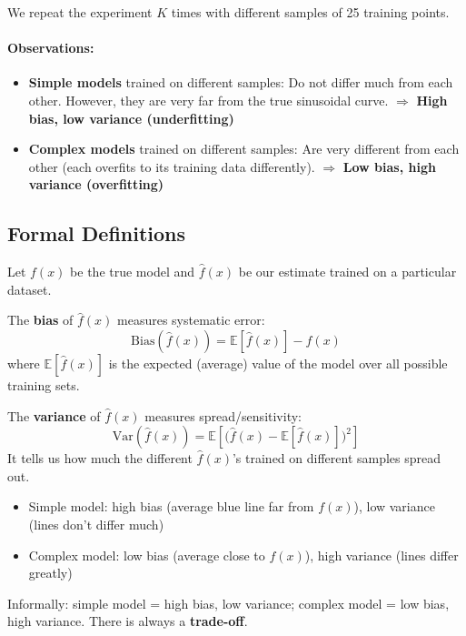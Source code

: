\documentclass[12pt,a4paper]{article}
\newcommand{\E}{\mathbb{E}}
\newcommand{\Var}{\mathrm{Var}}
\newcommand{\Bias}{\mathrm{Bias}}
\begin{document}
We repeat the experiment $K$ times with different samples of 25 training points.

\paragraph{Observations:}
\begin{itemize}
  \item \textbf{Simple models} trained on different samples: Do not differ much from each other. However, they are very far from the true sinusoidal curve. $\Rightarrow$ \textbf{High bias, low variance (underfitting)}
  \item \textbf{Complex models} trained on different samples: Are very different from each other (each overfits to its training data differently). $\Rightarrow$ \textbf{Low bias, high variance (overfitting)}
\end{itemize}

\subsection{Formal Definitions}

Let $f(x)$ be the true model and $\hat{f}(x)$ be our estimate trained on a particular dataset.

\begin{definitionbox}
The \textbf{bias} of $\hat{f}(x)$ measures systematic error:
\[
  \Bias(\hat{f}(x)) = \E[\hat{f}(x)] - f(x)
\]
where $\E[\hat{f}(x)]$ is the expected (average) value of the model over all possible training sets.

The \textbf{variance} of $\hat{f}(x)$ measures spread/sensitivity:
\[
  \Var(\hat{f}(x)) = \E\!\left[\bigl(\hat{f}(x) - \E[\hat{f}(x)]\bigr)^2\right]
\]
It tells us how much the different $\hat{f}(x)$'s trained on different samples spread out.
\end{definitionbox}

\begin{itemize}
  \item Simple model: high bias (average blue line far from $f(x)$), low variance (lines don't differ much)
  \item Complex model: low bias (average close to $f(x)$), high variance (lines differ greatly)
\end{itemize}

Informally: simple model = high bias, low variance; complex model = low bias, high variance. There is always a \textbf{trade-off}.
\end{document}
